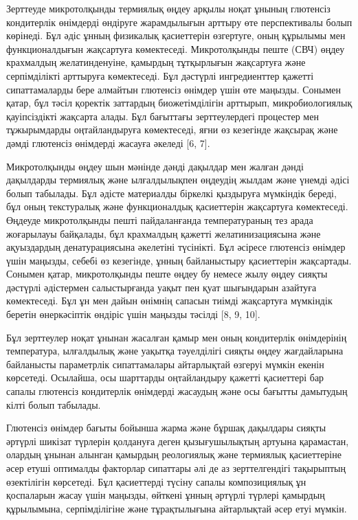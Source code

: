\begin{multicols}{2}
Зерттеуде микротолқынды термиялық өңдеу арқылы ноқат ұнының глютенсіз
кондитерлік өнімдерді өндіруге жарамдылығын арттыру өте перспективалы
болып көрінеді. Бұл әдіс ұнның физикалық қасиеттерін өзгертуге, оның
құрылымы мен функционалдығын жақсартуға көмектеседі. Микротолқынды пеште
(СВЧ) өңдеу крахмалдың желатинденуіне, қамырдың тұтқырлығын жақсартуға
және серпімділікті арттыруға көмектеседі. Бұл дәстүрлі ингредиенттер
қажетті сипаттамаларды бере алмайтын глютенсіз өнімдер үшін өте маңызды.
Сонымен қатар, бұл тәсіл қоректік заттардың биожетімділігін арттырып,
микробиологиялық қауіпсіздікті жақсарта алады. Бұл бағыттағы
зерттеулердегі процестер мен тұжырымдарды оңтайландыруға көмектеседі,
яғни өз кезегінде жақсырақ және дәмді глютенсіз өнімдерді жасауға
әкеледі {[}6, 7{]}.

Микротолқынды өңдеу шын мәнінде дәнді дақылдар мен жалған дәнді
дақылдарды термиялық және ылғалдылықпен өңдеудің жылдам және үнемді
әдісі болып табылады. Бұл әдісте материалды біркелкі қыздыруға мүмкіндік
береді, бұл оның текстуралық және функционалдық қасиеттерін жақсартуға
көмектеседі. Өңдеуде микротолқынды пешті пайдаланғанда температураның
тез арада жоғарылауы байқалады, бұл крахмалдың қажетті желатинизациясына
және ақуыздардың денатурациясына әкелетіні түсінікті. Бұл әсіресе
глютенсіз өнімдер үшін маңызды, себебі өз кезегінде, ұнның байланыстыру
қасиеттерін жақсартады. Сонымен қатар, микротолқынды пеште өңдеу бу
немесе жылу өңдеу сияқты дәстүрлі әдістермен салыстырғанда уақыт пен
қуат шығындарын азайтуға көмектеседі. Бұл ұн мен дайын өнімнің сапасын
тиімді жақсартуға мүмкіндік беретін өнеркәсіптік өндіріс үшін маңызды
тәсілді {[}8, 9, 10{]}.

Бұл зерттеулер ноқат ұнынан жасалған қамыр мен оның кондитерлік
өнімдерінің температура, ылғалдылық және уақытқа тәуелділігі сияқты
өңдеу жағдайларына байланысты параметрлік сипаттамалары айтарлықтай
өзгеруі мүмкін екенін көрсетеді. Осылайша, осы шарттарды оңтайландыру
қажетті қасиеттері бар сапалы глютенсіз кондитерлік өнімдерді жасаудың
және осы бағытты дамытудың кілті болып табылады.

Глютенсіз өнімдер бағыты бойынша жарма және бұршақ дақылдары сияқты
әртүрлі шикізат түрлерін қолдануға деген қызығушылықтың артуына
қарамастан, олардың ұнынан алынган қамырдың реологиялық және термиялық
қасиеттеріне әсер етуші оптималды факторлар сипаттары әлі де аз
зерттелгендігі тақырыптың өзектілігін көрсетеді. Бұл қасиеттерді түсіну
сапалы композициялық ұн қоспаларын жасау үшін маңызды, өйткені ұнның
әртүрлі түрлері қамырдың құрылымына, серпімділігіне және тұрақтылығына
айтарлықтай әсер етуі мүмкін.


\end{multicols}
